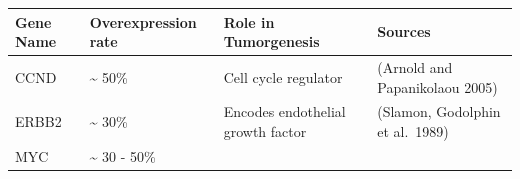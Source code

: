 \documentclass[]{article}
\begin{document}
\begin{longtable}[]{@{}llll@{}}
\toprule
\begin{minipage}[b]{0.07\columnwidth}\raggedright
Gene Name\strut
\end{minipage} & \begin{minipage}[b]{0.14\columnwidth}\raggedright
Overexpression rate\strut
\end{minipage} & \begin{minipage}[b]{0.27\columnwidth}\raggedright
Role in Tumorgenesis\strut
\end{minipage} & \begin{minipage}[b]{0.41\columnwidth}\raggedright
Sources\strut
\end{minipage}\tabularnewline
\midrule
\endhead
\begin{minipage}[t]{0.07\columnwidth}\raggedright
CCND\strut
\end{minipage} & \begin{minipage}[t]{0.14\columnwidth}\raggedright
\textasciitilde{} 50\%\strut
\end{minipage} & \begin{minipage}[t]{0.27\columnwidth}\raggedright
Cell cycle regulator\strut
\end{minipage} & \begin{minipage}[t]{0.41\columnwidth}\raggedright
(Arnold and Papanikolaou 2005)\strut
\end{minipage}\tabularnewline
\begin{minipage}[t]{0.07\columnwidth}\raggedright
ERBB2\strut
\end{minipage} & \begin{minipage}[t]{0.14\columnwidth}\raggedright
\textasciitilde{} 30\%\strut
\end{minipage} & \begin{minipage}[t]{0.27\columnwidth}\raggedright
Encodes endothelial growth factor\strut
\end{minipage} & \begin{minipage}[t]{0.41\columnwidth}\raggedright
(Slamon, Godolphin et al.~1989)\strut
\end{minipage}\tabularnewline
\begin{minipage}[t]{0.07\columnwidth}\raggedright
MYC\strut
\end{minipage} & \begin{minipage}[t]{0.14\columnwidth}\raggedright
\textasciitilde{} 30 - 50\%\strut
\end{minipage} & \begin{minipage}[t]{0.27\columnwidth}\raggedright

\end{minipage}
\end{longtable}
\end{document}
